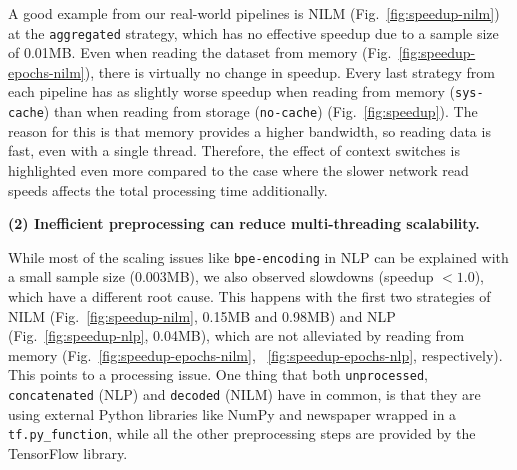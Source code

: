 {\color{diff}

A good example from our real-world pipelines is NILM (Fig.~\ref{fig:speedup-nilm}) at the \texttt{aggregated} strategy, which has no effective speedup due to a sample size of 0.01\:MB.
Even when reading the dataset from memory (Fig.~\ref{fig:speedup-epochs-nilm}), there is virtually no change in speedup.
Every last strategy from each pipeline has as slightly worse speedup when reading from memory (\texttt{sys-cache}) than when reading from storage (\texttt{no-cache}) (Fig.~\ref{fig:speedup}).
The reason for this is that memory provides a higher bandwidth, so reading data is fast, even with a single thread.
Therefore, the effect of context switches is highlighted even more compared to the case where the slower network read speeds affects the total processing time additionally.

\newpage
\textbf{(2) Inefficient preprocessing can reduce multi-threading scalability. }

While most of the scaling issues like \texttt{bpe-encoding} in NLP can be explained with a small sample size (0.003\:MB), we also observed slowdowns (speedup $< 1.0$), which have a different root cause.
This happens with the first two strategies of NILM (Fig.~\ref{fig:speedup-nilm}, 0.15\:MB and 0.98\:MB) and NLP (Fig.~\ref{fig:speedup-nlp}, 0.04MB), which are not alleviated by reading from memory (Fig.~\ref{fig:speedup-epochs-nilm}, ~\ref{fig:speedup-epochs-nlp}, respectively).
This points to a processing issue.
One thing that both \texttt{unprocessed}, \texttt{concatenated} (NLP) and \texttt{decoded} (NILM) have in common, is that they are using external Python libraries like NumPy and newspaper wrapped in a \texttt{tf.py\_function}, while all the other preprocessing steps are provided by the TensorFlow library.

}

